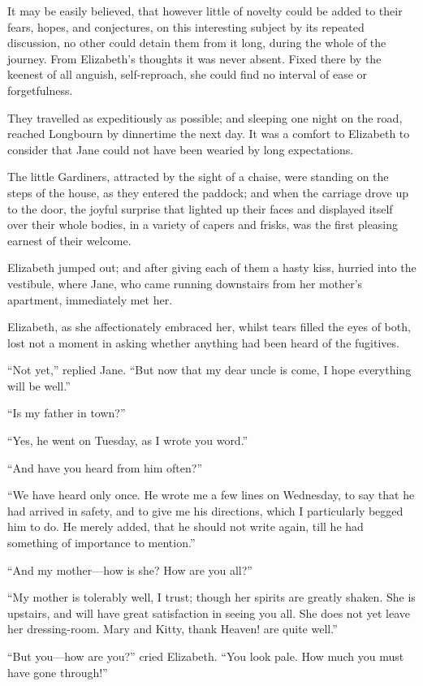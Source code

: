\documentclass[12pt]{book}
\begin{document}
It may be easily believed, that however little of novelty could be added to their fears, hopes, and conjectures, on this interesting subject by its repeated discussion, no other could detain them from it long, during the whole of the journey. From Elizabeth's thoughts it was never absent. Fixed there by the keenest of all anguish, self-reproach, she could find no interval of ease or forgetfulness.

They travelled as expeditiously as possible; and sleeping one night on the road, reached Longbourn by dinnertime the next day. It was a comfort to Elizabeth to consider that Jane could not have been wearied by long expectations.

The little Gardiners, attracted by the sight of a chaise, were standing on the steps of the house, as they entered the paddock; and when the carriage drove up to the door, the joyful surprise that lighted up their faces and displayed itself over their whole bodies, in a variety of capers and frisks, was the first pleasing earnest of their welcome.

Elizabeth jumped out; and after giving each of them a hasty kiss, hurried into the vestibule, where Jane, who came running downstairs from her mother's apartment, immediately met her.

Elizabeth, as she affectionately embraced her, whilst tears filled the eyes of both, lost not a moment in asking whether anything had been heard of the fugitives.

``Not yet,'' replied Jane. ``But now that my dear uncle is come, I hope everything will be well.''

``Is my father in town?''

``Yes, he went on Tuesday, as I wrote you word.''

``And have you heard from him often?''

``We have heard only once. He wrote me a few lines on Wednesday, to say that he had arrived in safety, and to give me his directions, which I particularly begged him to do. He merely added, that he should not write again, till he had something of importance to mention.''

``And my mother---how is she? How are you all?''

``My mother is tolerably well, I trust; though her spirits are greatly shaken. She is upstairs, and will have great satisfaction in seeing you all. She does not yet leave her dressing-room. Mary and Kitty, thank Heaven! are quite well.''

``But you---how are you?'' cried Elizabeth. ``You look pale. How much you must have gone through!''
\end{document}

